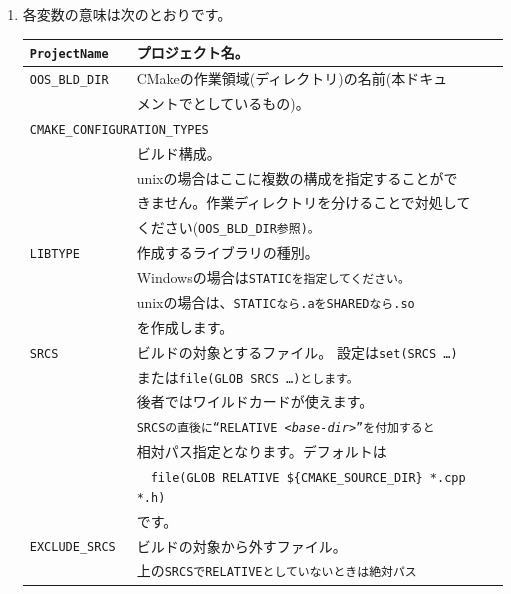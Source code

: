 \begin{narrow}[20pt]
	\begin{enumerate}
	    \item
		各変数の意味は次のとおりです。

		\medskip
		\def\SetRelPath{\tt{RELATIVE \$\{CMAKE\_SOURCE\_DIR\}}}
		\def\CMakeSrcDir{\tt{\$\{CMAKE\_SOURCE\_DIR\}}}
		\def\Explanation#1{\begin{minipage}[t]{222pt}{#1}\end{minipage}}

		\begin{narrow}[4pt]
		\begin{tabular}{|l|l|}\hline
		    \tt{ProjectName} &
			プロジェクト名。\\\hline
		    \tt{OOS\_BLD\_DIR} &
			CMakeの作業領域(ディレクトリ)の名前(本ドキュ\\
			& メントで\build としているもの)。\\\hline
		    \multicolumn{2}{|l|}{%
			\tt{CMAKE\_CONFIGURATION\_TYPES}} \\
			& ビルド構成。\\
			& unixの場合はここに複数の構成を指定することがで\\
			& きません。作業ディレクトリを分けることで対処して\\
			& ください(\tt{OOS\_BLD\_DIR}参照)。\\\hline
		    \tt{LIBTYPE} &
			作成するライブラリの種別。\\
			& Windowsの場合は\tt{STATIC}を指定してください。\\
			& unixの場合は、\tt{STATIC}なら\tt{.a}を\tt{SHARED}なら\tt{.so}\\
			& を作成します。\\\hline
		    \tt{SRCS} &
			ビルドの対象とするファイル。
			設定は\tt{set(SRCS …)} \\
			& または\tt{file(GLOB SRCS …)}とします。\\
			& 後者ではワイルドカードが使えます。\\
			& \tt{SRCS}の直後に``\tt{RELATIVE <\it{base-dir}>}''を付加すると \\
			& 相対パス指定となります。デフォルトは \\
			& \ \ {\footnotesize{\tt{file(GLOB \SetRelPath\ *.cpp *.h)}}} \\
			& です。\\\hline
		    \tt{EXCLUDE\_SRCS} &
			ビルドの対象から外すファイル。\\
			& 上の\tt{SRCS}で\tt{RELATIVE}としていないときは絶対パス \\

\end{tabular}
\end{narrow}
\end{enumerate}
\end{narrow}

